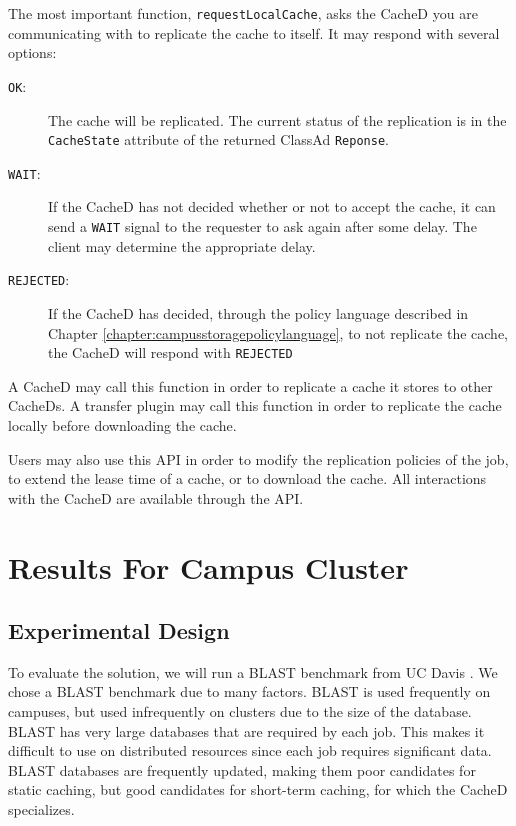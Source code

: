 The most important function, \texttt{requestLocalCache}, asks the CacheD you are communicating with to replicate the cache to itself.  It may respond with several options:

\begin{description}
	\item[\texttt{OK}:] The cache will be replicated.  The current status of the replication is in the \texttt{CacheState} attribute of the returned ClassAd \texttt{Reponse}.
	\item[\texttt{WAIT}:] If the CacheD has not decided whether or not to accept the cache, it can send a \texttt{WAIT} signal to the requester to ask again after some delay.  The client may determine the appropriate delay.
	\item[\texttt{REJECTED}:] If the CacheD has decided, through the policy language described in Chapter \ref{chapter:campusstoragepolicylanguage}, to not replicate the cache, the CacheD will respond with \texttt{REJECTED}
\end{description}

A CacheD may call this function in order to replicate a cache it stores to other CacheDs.  A transfer plugin may call this function in order to replicate the cache locally before downloading the cache.

Users may also use this API in order to modify the replication policies of the job, to extend the lease time of a cache, or to download the cache.  All interactions with the CacheD are available through the API.




\section{Results For Campus Cluster}

\subsection{Experimental Design}
To evaluate the solution, we will run a BLAST benchmark from UC Davis \cite{blastbenchmark}.  We chose a BLAST benchmark due to many factors.  BLAST is used frequently on campuses, but used infrequently on clusters due to the size of the database. BLAST has very large databases that are required by each job.  This makes it difficult to use on distributed resources since each job requires significant data.
BLAST databases are frequently updated, making them poor candidates for static caching, but good candidates for short-term caching, for which the CacheD specializes.

